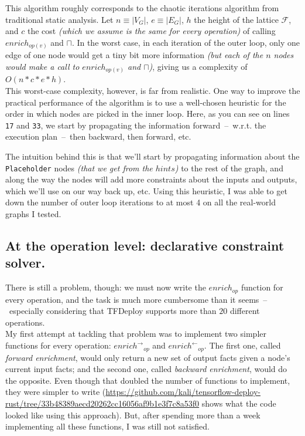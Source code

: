 \documentclass[11pt]{article}
\begin{document}
\bigskip
This algorithm roughly corresponds to the chaotic iterations algorithm from traditional static analysis. Let $n \equiv |V_G|$, $e \equiv |E_G|$, $h$ the height of the lattice $\mathcal{F}$, and $c$ the cost \textit{(which we assume is the same for every operation)} of calling $enrich_{op(v)}$ and $\sqcap$. In the worst case, in each iteration of the outer loop, only one edge of one node would get a tiny bit more information \textit{(but each of the $n$ nodes would make a call to $enrich_{op(v)}$ and $\sqcap$)}, giving us a complexity of $O(n * c * e * h)$.\\

This worst-case complexity, however, is far from realistic. One way to improve the practical performance of the algorithm is to use a well-chosen heuristic for the order in which nodes are picked in the inner loop. Here, as you can see on lines \texttt{17} and \texttt{33}, we start by propagating the information forward~--~w.r.t. the execution plan~--~then backward, then forward, etc.

The intuition behind this is that we'll start by propagating information about the \texttt{Placeholder} nodes \textit{(that we get from the $hints$)} to the rest of the graph, and along the way the nodes will add more constraints about the inputs and outputs, which we'll use on our way back up, etc. Using this heuristic, I was able to get down the number of outer loop iterations to at most 4 on all the real-world graphs I tested.\\

\bigskip
{}

\subsection{At the operation level: declarative constraint solver.}

There is still a problem, though: we must now write the $enrich_{op}$ function for every operation, and the task is much more cumbersome than it seems~--~especially considering that TFDeploy supports more than $20$ different operations.\\

My first attempt at tackling that problem was to implement two simpler functions for every operation: ${enrich^\rightarrow}_{op}$ and ${enrich^\leftarrow}_{op}$. The first one, called \textit{forward enrichment}, would only return a new set of output facts given a node's current input facts; and the second one, called \textit{backward enrichment}, would do the opposite. Even though that doubled the number of functions to implement, they were simpler to write (\url{https://github.com/kali/tensorflow-deploy-rust/tree/33b48389aecd20262cc16056af9b1e3f7c8a53f0} shows what the code looked like using this approach). But, after spending more than a week implementing all these functions, I was still not satisfied.
\end{document}
